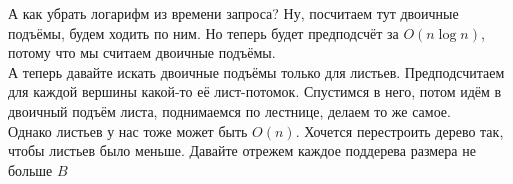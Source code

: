 \documentclass{article}
\begin{document}
    А как убрать логарифм из времени запроса? Ну, посчитаем тут двоичные подъёмы, будем ходить по ним. Но теперь будет предподсчёт за $O(n\log n)$, потому что мы считаем двоичные подъёмы.\\
    А теперь давайте искать двоичные подъёмы только для листьев. Предподсчитаем для каждой вершины какой-то её лист-потомок. Спустимся в него, потом идём в двоичный подъём листа, поднимаемся по лестнице, делаем то же самое.\\
    Однако листьев у нас тоже может быть $O(n)$. Хочется перестроить дерево так, чтобы листьев было меньше. Давайте отрежем каждое поддерева размера не больше $B$
    \begin{figure}[H]
\end{figure}
\end{document}
